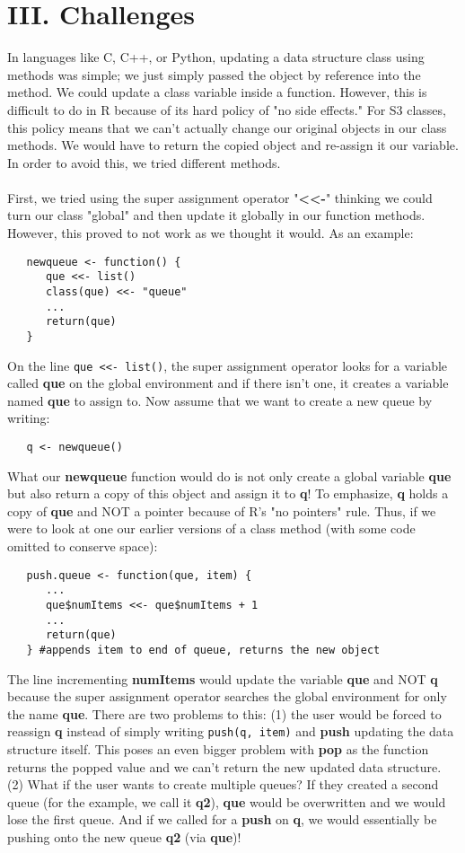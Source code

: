 \documentclass[a4paper, 11pt]{article} %
\begin{document}

\section*{III. Challenges}
\hspace{4ex}  In languages like C, C++, or Python, updating a data structure class using methods was simple; we just simply passed the object by reference into the method. We could update a class variable inside a function. However, this is difficult to do in R because of its hard policy of "no side effects." For S3 classes, this policy means that we can't actually change our original objects in our class methods. We would have to return the copied object and re-assign it our variable. In order to avoid this, we tried different methods.
\\\\
\indent First, we tried using the super assignment operator "\textbf{<<-}" thinking we could turn our class "global" and then update it globally in our function methods. However, this proved to not work as we thought it would. As an example:
\begin{verbatim}
   newqueue <- function() {
      que <<- list()
      class(que) <<- "queue"
      ...
      return(que)
   }

\end{verbatim}
On the line \texttt{que <<- list()}, the super assignment operator looks for a variable called \textbf{que} on the global environment and if there isn't one, it creates a variable named \textbf{que} to assign to. Now assume that we want to create a new queue by writing:
\begin{verbatim}
   q <- newqueue()
\end{verbatim}
What our \textbf{newqueue} function would do is not only create a global variable \textbf{que} but also return a copy of this object and assign it to \textbf{q}! To emphasize, \textbf{q} holds a copy of \textbf{que} and NOT a pointer because of R's "no pointers" rule. Thus, if we were to look at one our earlier versions of a class method (with some code omitted to conserve space):
\begin{verbatim}
   push.queue <- function(que, item) {  
      ...
      que$numItems <<- que$numItems + 1 
      ...
      return(que)
   } #appends item to end of queue, returns the new object
\end{verbatim}
The line incrementing \textbf{numItems} would update the variable \textbf{que} and NOT \textbf{q} because the super assignment operator searches the global environment for only the name \textbf{que}. There are two problems to this: (1) the user would be forced to reassign \textbf{q} instead of simply writing \texttt{push(q, item)} and \textbf{push} updating the data structure itself. This poses an even bigger problem with \textbf{pop} as the function returns the popped value and we can't return the new updated data structure. (2) What if the user wants to create multiple queues? If they created a second queue (for the example, we call it \textbf{q2}), \textbf{que} would be overwritten and we would lose the first queue. And if we called for a \textbf{push} on \textbf{q}, we would essentially be pushing onto the new queue \textbf{q2} (via \textbf{que})!
\end{document}
